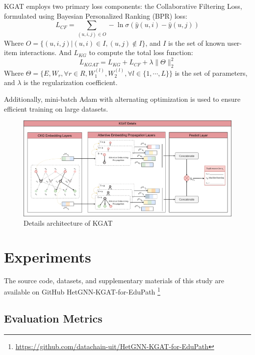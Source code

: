 \documentclass{ieeeaccess}
\begin{document}
KGAT employs two primary loss components: the Collaborative Filtering Loss, formulated using Bayesian Personalized Ranking (BPR) loss:
\begin{equation}
    L_{CF} = \sum_{(u, i, j) \in O} -\ln \sigma(\hat{y}(u, i) - \hat{y}(u, j))
\end{equation}
Where \( O = \{(u, i, j) | (u, i) \in I, (u, j) \notin I\} \), and \( I \) is the set of known user-item interactions.
And \( L_{KG} \) to compute the total loss function:
\begin{equation}
    L_{KGAT} = L_{KG} + L_{CF} + \lambda \| \Theta \|_2^2
\end{equation}
Where \( \Theta = \{E, W_r, \forall r \in R, W_1^{(l)}, W_2^{(l)}, \forall l \in \{1, \cdots, L\}\} \) is the set of parameters, and \( \lambda \) is the regularization coefficient.

Additionally, mini-batch Adam with alternating optimization is used to ensure efficient training on large datasets.
\begin{figure}[!t]
\centering
\includegraphics[width=2\columnwidth]{imgs/details_of_KGAT.png}
\caption{Details architecture of KGAT}
\label{fig:details_of_KGAT}
\end{figure}


\section{Experiments}
\label{sec:experiments}

The source code, datasets, and supplementary materials of this study are available on GitHub HetGNN-KGAT-for-EduPath \footnote{ \url{https://github.com/datachain-uit/HetGNN-KGAT-for-EduPath}}

\subsection{Evaluation Metrics}
\end{document}
